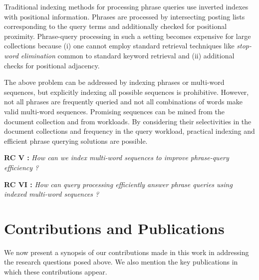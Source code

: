 \begin{enumerate}
Traditional indexing methods for processing phrase queries use inverted indexes with positional information. Phrases are processed by intersecting posting lists corresponding to the query terms and additionally checked for positional proximity. Phrase-query processing in such a setting becomes expensive for large collections because (i) one cannot employ standard retrieval techniques like \emph{stop-word elimination} common to standard keyword retrieval and (ii) additional checks for positional adjacency. 

The above problem can be addressed by indexing phrases or multi-word sequences, but explicitly indexing all possible sequences is prohibitive. However, not all phrases are frequently queried and not all combinations of words make valid multi-word sequences. Promising sequences can be mined from the document collection and from workloads. By considering their selectivities in the document collections and frequency in the query workload, practical indexing and efficient phrase querying solutions are possible.

\textbf{RC V :} \textit{How can we index multi-word sequences to improve phrase-query efficiency ?}

\textbf{RC VI :} \textit{How can query processing efficiently answer phrase queries using indexed multi-word sequences ?}

\end{enumerate}

\section{Contributions and Publications}
\label{sec:contributions}
We now present a synopsis of our contributions made in this work in addressing the research questions posed above. We also mention the key publications in which these contributions appear.

